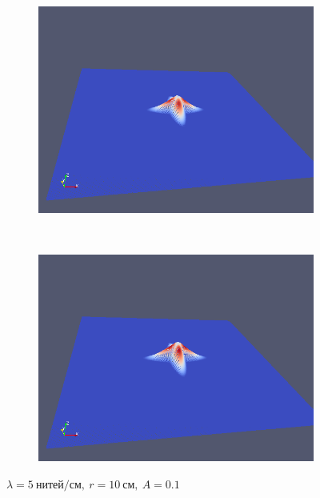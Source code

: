 \begin{figure}[H]
\begin{subfigure}[t]{0.5\textwidth}
        \includegraphics[width=\textwidth]{img/fiber/density_5_radius_10_amplitude_0.1/5.png}
    \end{subfigure}%
    ~
    \begin{subfigure}[t]{0.5\textwidth}
        \centering
        \includegraphics[width=\textwidth]{img/fiber/density_5_radius_10_amplitude_0.1/6.png}
    \end{subfigure}
    \caption{$\lambda=5~нитей/см,~r=10~см,~A=0.1$}
\end{figure}
